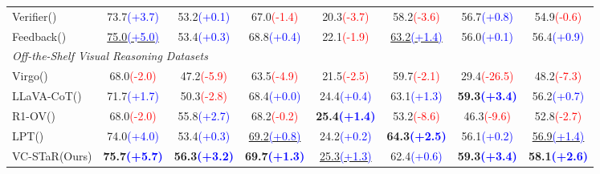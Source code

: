 \begin{table}[t!]
\begin{tabular}{lccccccc}
Verifier(\citeyear{lu2024autopsv}) & 73.7\textcolor{blue}{\tiny(+3.7)} & 53.2\textcolor{blue}{\tiny(+0.1)} & 67.0\textcolor{red}{\tiny(-1.4)} & 20.3\textcolor{red}{\tiny(-3.7)} & 58.2\textcolor{red}{\tiny(-3.6)} &56.7\textcolor{blue}{\tiny(+0.8)} & 54.9\textcolor{red}{\tiny(-0.6)}\\ \addlinespace[5pt]
Feedback(\citeyear{qu2024recursive})& \cellcolor{light-blue}\underline{75.0\textcolor{blue}{\tiny(+5.0)}} & 53.4\textcolor{blue}{\tiny(+0.3)} & 68.8\textcolor{blue}{\tiny(+0.4)} & 22.1\textcolor{red}{\tiny(-1.9)} & \cellcolor{light-blue}\underline{63.2\textcolor{blue}{\tiny(+1.4)}} & 56.0\textcolor{blue}{\tiny(+0.1)} & 56.4\textcolor{blue}{\tiny(+0.9)}\\
\midrule
\multicolumn{7}{l}{\textit{Off-the-Shelf Visual Reasoning Datasets}} \\ \addlinespace[1pt]
\midrule
Virgo(\citeyear{du2025virgopreliminaryexplorationreproducing})& 68.0\textcolor{red}{\tiny(-2.0)} & 47.2\textcolor{red}{\tiny(-5.9)} & 63.5\textcolor{red}{\tiny(-4.9)} & 21.5\textcolor{red}{\tiny(-2.5)} & 59.7\textcolor{red} {\tiny(-2.1)} & 29.4\textcolor{red}{\tiny(-26.5)} & 48.2\textcolor{red}{\tiny(-7.3)}\\ \addlinespace[5pt]
LLaVA-CoT(\citeyear{xu2024llava})& 71.7\textcolor{blue}{\tiny(+1.7)} & 50.3\textcolor{red}{\tiny(-2.8)} & 68.4\textcolor{blue}{\tiny(+0.0)} & 24.4\textcolor{blue}{\tiny(+0.4)} & 63.1\textcolor{blue}{\tiny(+1.3)} & \cellcolor{light-green}\textbf{59.3\textcolor{blue}{\tiny(+3.4)}} & 56.2\textcolor{blue}{\tiny(+0.7)}\\ \addlinespace[5pt]
R1-OV(\citeyear{yang2025r1onevisionadvancinggeneralizedmultimodal})& 68.0\textcolor{red}{\tiny(-2.0)} & 55.8\textcolor{blue}{\tiny(+2.7)} & 68.2\textcolor{red}{\tiny(-0.2)} & \cellcolor{light-green}\textbf{25.4\textcolor{blue}{\tiny(+1.4)}} & 53.2\textcolor{red}{\tiny(-8.6)} & 46.3\textcolor{red}{\tiny(-9.6)} & 52.8\textcolor{red}{\tiny(-2.7)}\\ \addlinespace[5pt]
LPT(\citeyear{liao2025longperceptualthoughts})& 74.0\textcolor{blue}{\tiny(+4.0)} & 53.4\textcolor{blue}{\tiny(+0.3)} & \cellcolor{light-blue}\underline{69.2\textcolor{blue}{\tiny(+0.8)}} & 24.2\textcolor{blue}{\tiny(+0.2)} & \cellcolor{light-green}\textbf{64.3\textcolor{blue}{\tiny(+2.5)}}  & 56.1\textcolor{blue}{\tiny(+0.2)} & \cellcolor{light-blue}\underline{56.9\textcolor{blue}{\tiny(+1.4)}}\\
\midrule
VC-STaR(Ours)& \cellcolor{light-green}\textbf{75.7\textcolor{blue}{\tiny(+5.7)}} & \cellcolor{light-green}\textbf{56.3\textcolor{blue}{\tiny(+3.2)}} & \cellcolor{light-green}\textbf{69.7\textcolor{blue}{\tiny(+1.3)}} & \cellcolor{light-blue}\underline{25.3\textcolor{blue}{\tiny(+1.3)}} & 62.4\textcolor{blue}{\tiny(+0.6)} &\cellcolor{light-green}\textbf{59.3\textcolor{blue}{\tiny(+3.4)}} & \cellcolor{light-green}\textbf{58.1\textcolor{blue}{\tiny(+2.6)}}\\
\bottomrule
\end{tabular}
\end{table}
